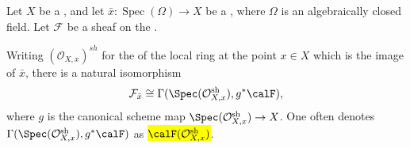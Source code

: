 \begin{theorem} \label{theorem:stalks_of_etale_sheaves_at_geometric_points_are_the_values_of_the_sheaves_at_the_strict_henselization_of_the_local_rings_at_the_image_of_the_point}

Let $X$ be a , and let $\bar{x} : \operatorname{Spec}(\Omega) \to X$ be a , where $\Omega$ is an algebraically closed field. Let $\mathcal{F}$ be a sheaf on the . 

Writing $(\mathcal{O}_{X,x})^{sh}$ for the  of the local ring at the point $x \in X$ which is the image of $\bar{x}$, there is a natural isomorphism
$$ \mathcal{F}_{\bar{x}} \cong \Gamma(\Spec(\mathcal{O}_{X,x}^\text{sh}), g^* \calF), $$
where $g$ is the canonical scheme map $\Spec(\mathcal{O}_{X,x}^\text{sh}) \to X$. One often denotes $\Gamma(\Spec(\mathcal{O}_{X,x}^\text{sh}), g^* \calF)$ as \hl{$\calF(\mathcal{O}_{X,x}^\text{sh})$}.

\end{theorem}